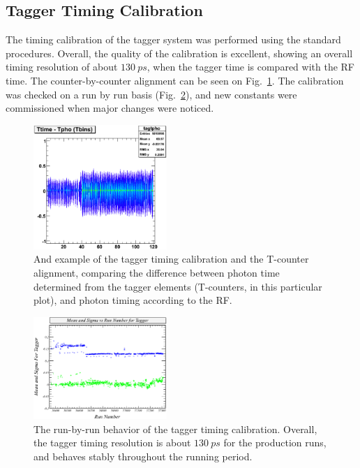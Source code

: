 \subsection{\label{sec:calib.tag}Tagger Timing Calibration}
The timing calibration of the tagger system was performed using the standard procedures. Overall, the quality of the calibration is excellent, showing an overall timing resolution of about $130~ps$, when the tagger time is compared with the RF time. The counter-by-counter alignment can be seen on Fig.~\ref{tagtpho}. The calibration was checked on a run by run basis (Fig.~\ref{tagRun}), and new constants were commissioned when major changes were noticed.

\begin{figure}[h]
\begin{center}
 \includegraphics[width=0.45\textwidth]{figures/calib/tag/timing/tagtpho.eps}
  \caption{And example of the tagger timing calibration and the T-counter alignment, comparing  the difference between photon time determined from the tagger elements (T-counters, in this particular plot), and photon timing according to the RF. }
  \label{tagtpho}
  \end{center}
\end{figure}


\begin{figure}[h]
\begin{center}
 \includegraphics[width=0.45\textwidth]{figures/calib/tag/timing/tagRun.eps}
  \caption{The run-by-run behavior of the tagger timing calibration. Overall, the tagger timing resolution is about $130~ps$ for the production runs, and behaves stably throughout the running period.}
  \label{tagRun}
  \end{center}
\end{figure}
